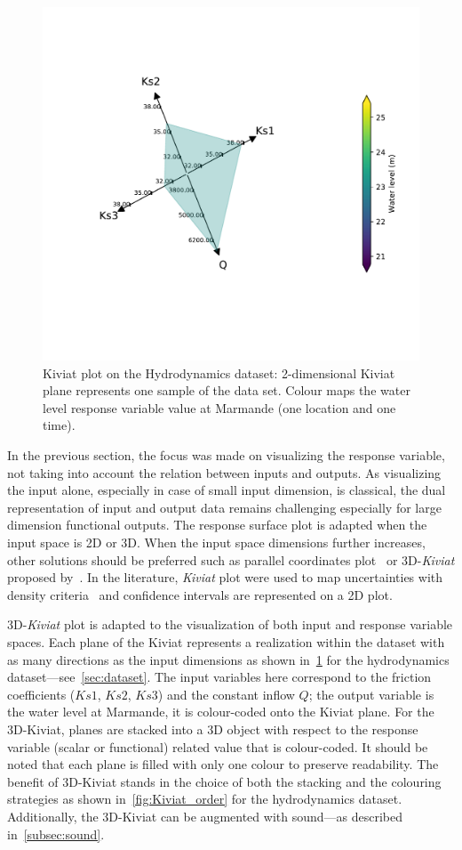 \begin{figure}[!ht]
\centering
\includegraphics[width=0.8\linewidth,keepaspectratio]{fig/contributions/visu/mascaret_2D.pdf}
\caption{Kiviat plot on the Hydrodynamics dataset: 2-dimensional Kiviat plane represents one sample of the data set. Colour maps the water level response variable value at Marmande (one location and one time).}
\label{fig:Kiviat_color}
\end{figure}

In the previous section, the focus was made on visualizing the response variable, not taking into account the relation between inputs and outputs. As visualizing the input alone, especially in case of small input dimension, is classical, the dual representation of input and output data remains challenging especially for large dimension functional outputs. The response surface plot is adapted when the input space is 2D or 3D. When the input space dimensions further increases, other solutions should be preferred such as parallel coordinates plot~\cite{Inselberg1985,Inselberg2009} or 3D-\emph{Kiviat} proposed by~\citep{Hackstadt1994}. In the literature, \emph{Kiviat} plot were used to map uncertainties with density criteria~\citep{VanSomeren2016} and confidence intervals are represented on a 2D plot.

3D-\emph{Kiviat} plot is adapted to the visualization of both input and response variable spaces. Each plane of the Kiviat represents a realization within the dataset with as many directions as the input dimensions as shown in~\cref{fig:Kiviat_color} for the hydrodynamics dataset---see~\cref{sec:dataset}. The input variables here correspond to the friction coefficients ($Ks1$, $Ks2$, $Ks3$) and the constant inflow $Q$; the output variable is the water level at Marmande, it is colour-coded onto the Kiviat plane. For the 3D-Kiviat, planes are stacked into a 3D object with respect to the response variable (scalar or functional) related value that is colour-coded. It should be noted that each plane is filled with only one colour to preserve readability. The benefit of 3D-Kiviat stands in the choice of both the stacking and the colouring strategies as shown in~\cref{fig:Kiviat_order} for the hydrodynamics dataset. Additionally, the 3D-Kiviat can be augmented with sound---as described in~\cref{subsec:sound}.

